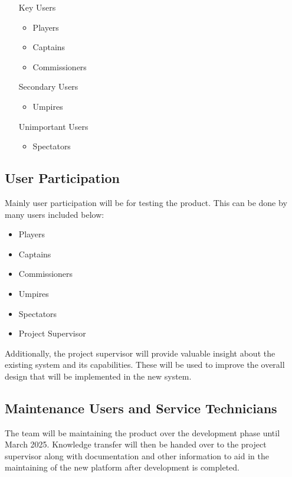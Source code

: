 \documentclass[12pt]{article}
\begin{document}
\begin{itemize}
  \item [Key Users]
  \begin{itemize}
    \item Players
    \item Captains
    \item Commissioners
  \end{itemize}
  \item [Secondary Users]
  \begin{itemize}
    \item Umpires
  \end{itemize}
  \item [Unimportant Users]
  \begin{itemize}
    \item Spectators
  \end{itemize}
\end{itemize}

\subsection{User Participation}

Mainly user participation will be for testing the product. This can
be done by many users included below:

\begin{itemize}
  \item Players
  \item Captains
  \item Commissioners
  \item Umpires
  \item Spectators
  \item Project Supervisor
\end{itemize}

Additionally, the project supervisor will provide valuable
insight about the existing system and its capabilities. These
will be used to improve the overall design that will be implemented
in the new system.

\subsection{Maintenance Users and Service Technicians}

The team will be maintaining the product over the development phase until
March 2025. Knowledge transfer will then be handed over to the
project supervisor along with documentation and other information to aid
in the maintaining of the new platform after development is completed.
\end{document}
